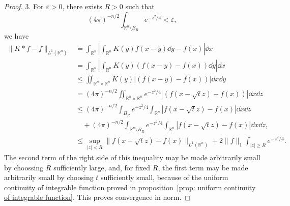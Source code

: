 \begin{proof}
	3. 	 
	For $\varepsilon>0$, there exists $R>0$ such that 
	\[
	(4\pi)^{-n/2}\int_{\mathbb R^n\setminus B_R}e^{-z^2/4}<\varepsilon,
	\]
	we have 
	\begin{align*}
		\|K*f-f\|_{L^1(\mathbb R^n)} 
		&= \int_{\mathbb{R}^n}\left|\int_{\mathbb{R}^n}K(y)f(x-y)\dd y - f(x)\right|\dd x \\
		&= \int_{\mathbb{R}^n}\left|\int_{\mathbb{R}^n}K(y)(f(x-y) - f(x))\dd y\right|\dd x\\
		&\leq \iint_{\mathbb{R}^n\times\mathbb{R}^n}K(y)|(f(x-y) - f(x))|\dd x\dd y\\
		&= (4\pi)^{-n/2}\iint_{\mathbb{R}^n\times\mathbb R^n}e^{-z^2/4}|(f(x-\sqrt tz)-f(x))|\dd x\dd z\\
		&\leq (4\pi)^{-n/2}\int_{B_R}e^{-z^2/4}\int_{\mathbb{R}^n}|f(x-\sqrt tz)-f(x)|\dd x\dd z\\
		&\quad + (4\pi)^{-n/2}\int_{\mathbb R^n\setminus B_R}e^{-z^2/4}\int_{\mathbb{R}^n}|f(x-\sqrt tz)-f(x)|\dd x\dd z,\\
		&\leq \sup_{|z|<R}\|f(x-\sqrt t z) - f(x)\|_{L^1(\mathbb R^n)} 
		+ 2\|f\|_1\int_{|z|\geq R}e^{-z^2/4}.
	\end{align*}
	The second term of the right side of this inequality 
	may be made arbitrarily small by choossing $R$ sufficiently large,
	and, for fixed $R$, 
	the first term may be made arbitrarily small by choosing $t$ sufficiently small, 
	because of the uniform continuity of integrable function proved in  proposition~\ref{prop: uniform continuity of integrable function}. 
	This proves convergence in norm.



\end{proof}
